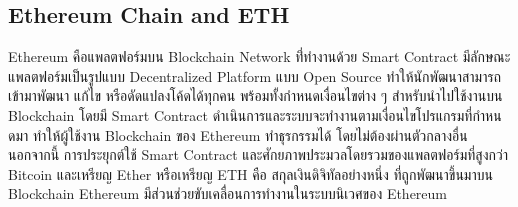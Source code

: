 \documentclass[12pt,oneside,openright,a4paper]{cpe-thai-project}
\begin{document}
\subsection{Ethereum Chain and ETH\cite{eth}}
\tab Ethereum คือแพลตฟอร์มบน Blockchain Network ที่่ทํางานด้วย Smart Contract มีลักษณะแพลตฟอร์มเป็นรูปแบบ Decentralized Platform แบบ Open Source ทําให้นักพัฒนาสามารถเข้ามาพัฒนา แก้ไข หรือดัดแปลงโค้ดได้ทุกคน พร้อมทั้งกําหนดเงื่อนไขต่าง ๆ สําหรับนําไปใช้งานบน Blockchain โดยมี Smart Contract ดําเนินการและระบบจะทํางานตามเงื่อนไขโปรแกรมที่กําหนดมา ทําให้ผู้ใช้งาน Blockchain ของ Ethereum ทําธุรกรรมได้ โดยไม่ต้องผ่านตัวกลางอื่น นอกจากนี้ การประยุกต์ใช้ Smart Contract และศักยภาพประมวลโดยรวมของแพลตฟอร์มที่สูงกว่า Bitcoin และเหรียญ Ether หรือเหรียญ ETH คือ สกุลเงินดิจิทัลอย่างหนึ่ง ที่ถูกพัฒนาขึ้นมาบน Blockchain Ethereum มีส่วนช่วยขับเคลื่อนการทํางานในระบบนิเวศของ Ethereum
\end{document}
